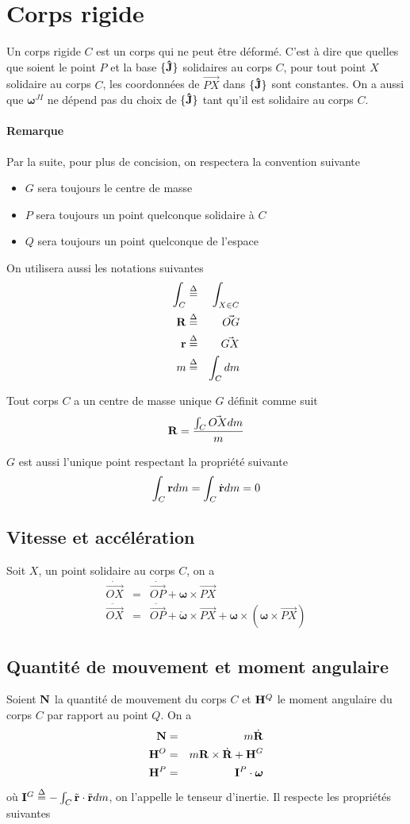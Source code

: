 \documentclass[11pt,a4paper]{article}
\newcommand\fv[1]{{\bf #1}} %
\newcommand\fvd[1]{\dot{\bf #1}} %
\newcommand\uj{{\bf\hat{J}}} %
\newcommand\eqdef{\stackrel{\Delta}{=}}
\newcommand\omegaf{{\bm \omega}}
\newcommand\omegafr{\mathring{\bm \omega}}
\newcommand\ine{{\bf I}}
\newcommand\lm{{\bf N}}
\newcommand\am{{\bf H}}
\newcommand\xg{\ensuremath{\fv{R}}}
\newcommand\xgd{\ensuremath{\fvd{R}}}
\newcommand\dvec[1]{\dot{\vec{ #1}}}
\newcommand\ddvec[1]{\ddot{\vec{ #1}}}
\begin{document}
\section{Corps rigide}
Un corps rigide $C$ est un corps qui ne peut être déformé.
C'est à dire que quelles que soient le point $P$ et la base $\{\uj\}$ solidaires au corps $C$, pour tout point $X$ solidaire au corps $C$, les coordonnées de $\vec{PX}$ dans $\{\uj\}$ sont constantes.
On a aussi que $\omegaf^{JI}$ ne dépend pas du choix de $\{\uj\}$ tant qu'il est solidaire au corps $C$.

\paragraph{Remarque}
Par la suite, pour plus de concision, on respectera la convention suivante
\begin{itemize}
	\item $G$ sera toujours le centre de masse
	\item $P$ sera toujours un point quelconque solidaire à $C$
	\item $Q$ sera toujours un point quelconque de l'espace
\end{itemize}

On utilisera aussi les notations suivantes
\begin{eqnarray*}
	\int_C &\eqdef& \int_{X \in C}\\
	\xg &\eqdef& \vec{OG}\\
	\fv{r} &\eqdef& \vec{GX}\\
	m &\eqdef& \int_C dm
\end{eqnarray*}

Tout corps $C$ a un centre de masse unique $G$ définit comme suit
\[ \xg = \frac{\int_C \vec{OX} dm}{m} \]

$G$ est aussi l'unique point respectant la propriété suivante
\[ \int_C \fv{r} dm = \int_C \fvd{r} dm = 0 \]

\subsection{Vitesse et accélération}
Soit $X$, un point solidaire au corps $C$, on a
\begin{eqnarray*}
	\dvec{OX} &=& \dvec{OP} + \omegaf \times \vec{PX}\\
	\ddvec{OX} &=& \ddvec{OP} + \omegafr \times \vec{PX} + \omegaf \times (\omegaf \times \vec{PX})
\end{eqnarray*}

\subsection{Quantité de mouvement et moment angulaire}
Soient $\lm$ la quantité de mouvement du corps $C$ et $\am^Q$ le moment angulaire du corps $C$ par rapport au point $Q$.
On a
\begin{eqnarray*}
	\lm &=& m \xgd\\
	\am^O &=& m \xg \times \xgd + \am^G\\
	\am^P &=& \ine^P \cdot \omegaf
\end{eqnarray*}
où $\ine^G \eqdef -\int_C \tilde{\fv{r}}\cdot\tilde{\fv{r}} dm$, on l'appelle le tenseur d'inertie.
Il respecte les propriétés suivantes
\end{document}
